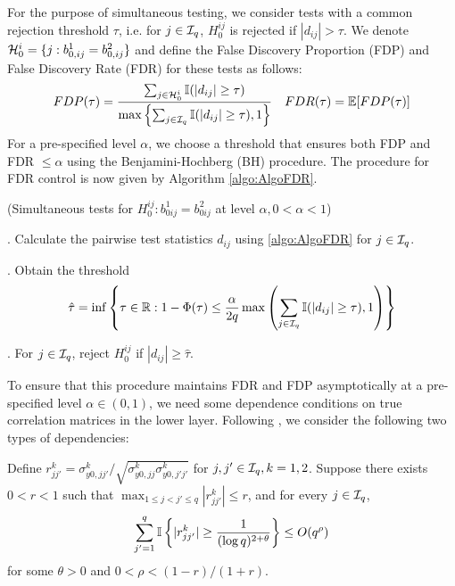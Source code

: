 For the purpose of simultaneous testing, we consider tests with a common rejection threshold $\tau$, i.e. for $j \in {\cal{I}}_q$, $H_0^{ij}$ is rejected if $| d_{ij} | > \tau$. We denote ${\cal{H}}_0^i = \{ j: b_{0,ij}^1 = b_{0,ij}^2 \}$ and define the False Discovery Proportion (FDP) and False Discovery Rate (FDR) for these tests as follows:
%
$$
FDP (\tau) = \frac{\sum_{j \in {\cal{H}}_0^i} {\mathbb{I}}( |d_{ij}| \geq \tau)}{\max\left\{
\sum_{j \in {\cal{I}}_q} {\mathbb{I}}( |d_{ij}| \geq \tau), 1\right\} }\quad
FDR (\tau) = {\mathbb{E}} [ FDP (\tau) ]
$$
%
For a pre-specified level $\alpha$, we choose a threshold that ensures both FDP and FDR $\leq \alpha$ using the Benjamini-Hochberg (BH) procedure. %
The procedure for FDR control is now given by Algorithm \ref{algo:AlgoFDR}.

\begin{Algorithm}\label{algo:AlgoFDR}
(Simultaneous tests for $H_0^{ij}: b_{0 ij}^1 = b_{0 ij}^2$ at level $\alpha, 0< \alpha< 1$)

. Calculate the pairwise test statistics $d_{ij}$ using \eqref{algo:AlgoFDR} for $j \in {\cal{I}}_q$.

. Obtain the threshold
%
$$
\hat \tau = \inf \left\{\tau \in {\mathbb{R}}: 1 - \Phi(\tau) \leq \frac{\alpha}{2 q}
\max \left( \sum_{j \in {\cal{I}}_q} {\mathbb{I}}( |d_{ij}| \geq \tau), 1 \right) \right\}
$$
%

. For $j \in {\cal{I}}_q$, reject $H_0^{ij}$ if $|d_{ij}| \geq \hat \tau$.
\end{Algorithm}

To ensure that this procedure maintains FDR and FDP asymptotically at a pre-specified level $\alpha \in (0,1)$, we need some dependence conditions on true correlation matrices in the lower layer. Following \citet{LiuShao14}, we consider the following two types of dependencies:

 Define $r_{jj'}^k = \sigma_{y0,jj'}^k /\sqrt{\sigma_{y0,jj}^k \sigma_{y0,j'j'}^k}$ for $j,j' \in {\cal{I}}_q, k = 1,2$. Suppose there exists $0 < r < 1$ such that $\max_{1 \leq j < j' \leq q} | r_{jj'}^k | \leq r$, and for every $j \in {\cal{I}}_q$,
%
$$
\sum_{j'=1}^q {\mathbb{I}} \left\{ |r_{jj'}^k| \geq \frac{1}{(\log q)^{2 + \theta}} \right\} \leq O(q^\rho)
$$
%
for some $\theta > 0$ and $0 < \rho < (1-r)/(1+r)$.

